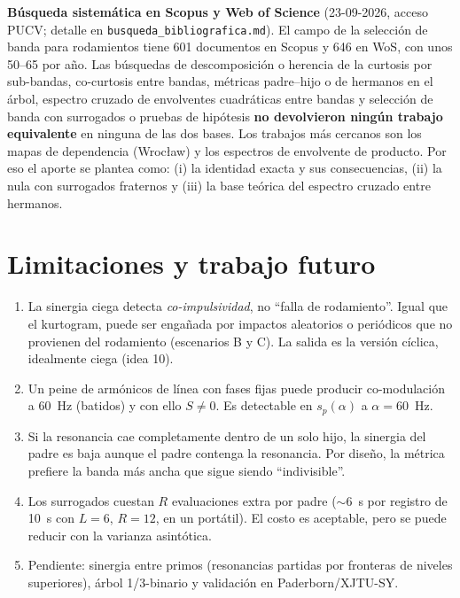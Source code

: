 \documentclass[11pt,a4paper]{article}
\theoremstyle{definition}
\theoremstyle{remark}
\begin{document}
\textbf{Búsqueda sistemática en Scopus y Web of Science} (23-09-2026, acceso PUCV; detalle en \texttt{busqueda\_bibliografica.md}). El campo de la selección de banda para rodamientos tiene 601 documentos en Scopus y 646 en WoS, con unos 50--65 por año. Las búsquedas de descomposición o herencia de la curtosis por sub-bandas, co-curtosis entre bandas, métricas padre--hijo o de hermanos en el árbol, espectro cruzado de envolventes cuadráticas entre bandas y selección de banda con surrogados o pruebas de hipótesis \textbf{no devolvieron ningún trabajo equivalente} en ninguna de las dos bases. Los trabajos más cercanos son los mapas de dependencia (Wrocław) y los espectros de envolvente de producto. Por eso el aporte se plantea como: (i) la identidad exacta y sus consecuencias, (ii) la nula con surrogados fraternos y (iii) la base teórica del espectro cruzado entre hermanos.

\section{Limitaciones y trabajo futuro}
\begin{enumerate}[leftmargin=*]
\item La sinergia ciega detecta \emph{co-impulsividad}, no ``falla de rodamiento''. Igual que el kurtogram, puede ser engañada por impactos aleatorios o periódicos que no provienen del rodamiento (escenarios B y C). La salida es la versión cíclica, idealmente ciega (idea 10).
\item Un peine de armónicos de línea con fases fijas puede producir co-modulación a 60~Hz (batidos) y con ello $S\ne0$. Es detectable en $s_p(\alpha)$ a $\alpha=60$~Hz.
\item Si la resonancia cae completamente dentro de un solo hijo, la sinergia del padre es baja aunque el padre contenga la resonancia. Por diseño, la métrica prefiere la banda más ancha que sigue siendo ``indivisible''.
\item Los surrogados cuestan $R$ evaluaciones extra por padre ($\sim$6~s por registro de 10~s con $L=6$, $R=12$, en un portátil). El costo es aceptable, pero se puede reducir con la varianza asintótica.
\item Pendiente: sinergia entre primos (resonancias partidas por fronteras de niveles superiores), árbol 1/3-binario y validación en Paderborn/XJTU-SY.
\end{enumerate}
\end{document}
